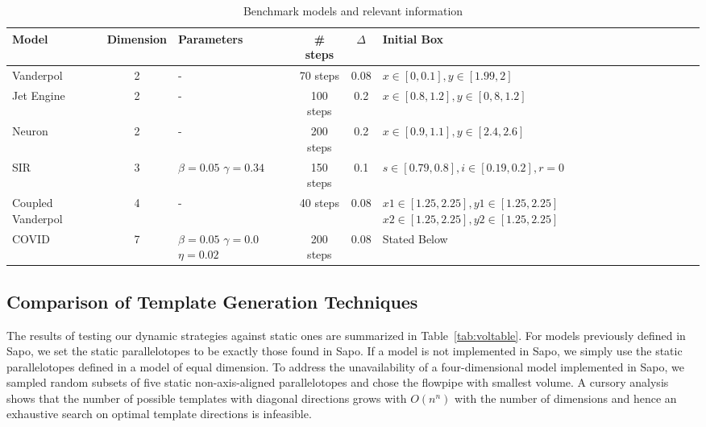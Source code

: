 \begin{table}
  \centering
\begin{tabular}{|p{1.5cm}|c|p{1.7cm}|c|c|p{5cm}|}
\hline
Model & Dimension & Parameters & \# steps & $\Delta$ & \hspace{1.5cm}Initial Box \\
\hline
Vanderpol & 2 & \quad \quad \; - & 70 steps & 0.08 & $x \in [0,0.1], y \in [1.99,2]$ \\
\hline
Jet Engine& 2 & \quad \quad \; - & 100 steps & 0.2 & $x \in [0.8,1.2], y \in [0,8,1.2]$ \\
\hline
Neuron \cite{fitzhugh1961impulses}& 2 & \quad \quad \; - & 200 steps & 0.2 & $x \in [0.9,1.1], y \in [2.4,2.6]$ \\
\hline
SIR& 3 & $\beta=0.05$ \newline $\gamma=0.34$ & 150 steps & 0.1 & $s \in [0.79,0.8], i \in [0.19,0.2], r = 0$ \\
\hline
Coupled \newline Vanderpol & 4 & \quad \quad \; - & 40 steps & 0.08 & $x1 \in [1.25, 2.25], y1 \in [1.25, 2.25]$ \newline $x2 \in [1.25, 2.25], y2 \in [1.25, 2.25]$ \\
\hline
COVID & 7 & $\beta=0.05$ \newline $\gamma=0.0$ \newline $\eta=0.02$ & 200 steps & 0.08 & \quad \quad \quad \; \; Stated Below\\
\hline
\end{tabular}
\caption{Benchmark models and relevant information}
\label{tab:modeldyns}
\end{table}
\subsection{Comparison of Template Generation Techniques}
\label{sec:compare}

The results of testing our dynamic strategies against static ones are summarized in Table~\ref{tab:voltable}. For models previously defined in Sapo, we set the static parallelotopes to be exactly those found in Sapo.
If a model is not implemented in Sapo, we simply use the static parallelotopes defined in a model of equal dimension. To address the unavailability of a four-dimensional model implemented in Sapo, we sampled random subsets of five static non-axis-aligned parallelotopes and chose the flowpipe with smallest volume.
%
%
A cursory analysis shows that the number of possible templates with diagonal directions grows with $O(n^n)$ with the number of dimensions and hence an exhaustive search on optimal template directions is infeasible.

